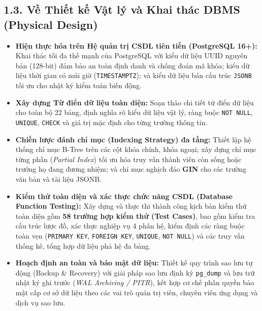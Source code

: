 \subsection*{1.3. Về Thiết kế Vật lý và Khai thác DBMS (Physical Design)}
{}
\begin{itemize}[leftmargin=*]
    \item \textbf{Hiện thực hóa trên Hệ quản trị CSDL tiên tiến (PostgreSQL 16+):} Khai thác tối đa thế mạnh của PostgreSQL với kiểu dữ liệu UUID nguyên bản (128-bit) đảm bảo an toàn định danh và chống đoán mã khóa; kiểu dữ liệu thời gian có múi giờ (\texttt{TIMESTAMPTZ}); và kiểu dữ liệu bán cấu trúc \texttt{JSONB} tối ưu cho nhật ký kiểm toán biến động.
    \item \textbf{Xây dựng Từ điển dữ liệu toàn diện:} Soạn thảo chi tiết từ điển dữ liệu cho toàn bộ 22 bảng, định nghĩa rõ kiểu dữ liệu vật lý, ràng buộc \texttt{NOT NULL}, \texttt{UNIQUE}, \texttt{CHECK} và giá trị mặc định cho từng trường thông tin.
    \item \textbf{Chiến lược đánh chỉ mục (Indexing Strategy) đa tầng:} Thiết lập hệ thống chỉ mục B-Tree trên các cột khóa chính, khóa ngoại; xây dựng chỉ mục từng phần (\textit{Partial Index}) tối ưu hóa truy vấn thành viên còn sống hoặc trưởng họ đang đương nhiệm; và chỉ mục nghịch đảo \textbf{GIN} cho các trường văn bản và tài liệu JSONB.
    \item \textbf{Kiểm thử toàn diện và xác thực chức năng CSDL (Database Function Testing):} Xây dựng và thực thi thành công kịch bản kiểm thử toàn diện gồm \textbf{58 trường hợp kiểm thử (Test Cases)}, bao gồm kiểm tra cấu trúc lược đồ, xác thực nghiệp vụ 4 phân hệ, kiểm định các ràng buộc toàn vẹn (\texttt{PRIMARY KEY}, \texttt{FOREIGN KEY}, \texttt{UNIQUE}, \texttt{NOT NULL}) và các truy vấn thống kê, tổng hợp dữ liệu phả hệ đa bảng.
    \item \textbf{Hoạch định an toàn và bảo mật dữ liệu:} Thiết kế quy trình sao lưu tự động (Backup \& Recovery) với giải pháp sao lưu định kỳ \texttt{pg\_dump} và lưu trữ nhật ký ghi trước (\textit{WAL Archiving / PITR}), kết hợp cơ chế phân quyền bảo mật cấp cơ sở dữ liệu theo các vai trò quản trị viên, chuyên viên ứng dụng và dịch vụ sao lưu.
\end{itemize}


